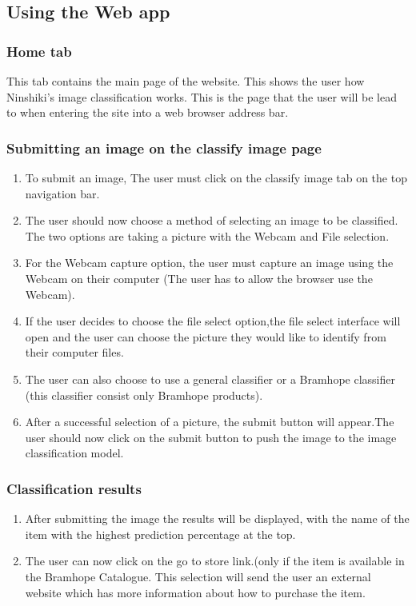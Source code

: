 \documentclass[a4paper, 12pt]{article}
\begin{document}
\subsection{Using the Web app}
\subsubsection{Home tab}
This tab contains the main page of the website. This shows the user how Ninshiki's image classification works. This is the page that the user will be lead to when entering the site into a web browser address bar.

\subsubsection{Submitting an image on the classify image page}

\begin{enumerate}
\item To submit an image, The  user must click on the classify image tab on the top navigation bar.
\item The user should now choose a method of selecting an image to be classified. The two options are taking a picture with the Webcam and File selection.
\item For the Webcam capture option, the user must capture an image using the Webcam on their computer (The user has to allow the browser use the Webcam).

\item If the user decides to choose the file select option,the file select interface will open and the user can choose the picture they would like to identify from their computer files. 

\item The user can also choose to use a general classifier or a Bramhope classifier (this classifier consist only Bramhope products). 

\item After a successful selection of a picture, the submit button will appear.The user should now click on the submit button to push the image to the image classification model.

\end{enumerate}

\subsubsection{Classification results}
\begin{enumerate}
\item After submitting the image the results will be displayed, with the name of the item  with the highest prediction percentage at the top.
\item The user can now click on the go to store link.(only if the item is available in the Bramhope Catalogue. This selection will send the user an external website which has more information about how to purchase the item.
\end{enumerate}
\end{document}
